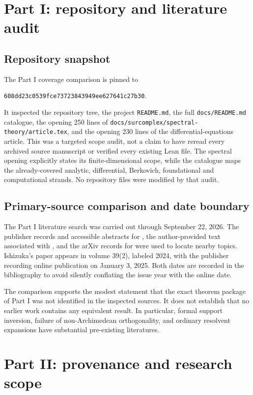 \documentclass[11pt,a4paper]{article}
\numberwithin{equation}{section}
\theoremstyle{definition}
\theoremstyle{remark}
\newcommand{\commitA}{608dd23c0539fce73723843949ee627641c27b30}
\begin{document}
\appendix
\section{Part I: repository and literature audit}\label{ihs:app:auditA}

\subsection{Repository snapshot}\label{ihs:app:snapshotA}
The Part I coverage comparison is pinned to
\begin{center}\small\texttt{\commitA}.\end{center}
It inspected the repository tree, the project \texttt{README.md}, the full
\texttt{docs/README.md} catalogue, the opening 250 lines of
\texttt{docs/surcomplex/spectral-theory/article.tex}, and the opening 230
lines of the differential-equations article. This was a targeted scope
audit, not a claim to have reread every archived source manuscript or
verified every existing Lean file. The spectral opening explicitly states
its finite-dimensional scope, while the catalogue maps the already-covered
analytic, differential, Berkovich, foundational and computational strands.
No repository files were modified by that audit.

\subsection{Primary-source comparison and date boundary}\label{ihs:app:datesA}
The Part I literature search was carried out through September 22, 2026. The
publisher records and accessible abstracts for \cite{ANS,Ishizuka}, the
author-provided text associated with \cite{AN}, and the arXiv records for
\cite{Boasso,Miabey} were used to locate nearby topics. Ishizuka's paper
appears in volume 39(2), labeled 2024, with the publisher recording online
publication on January 3, 2025. Both dates are recorded in the bibliography
to avoid silently conflating the issue year with the online date.

The comparison supports the modest statement that the exact theorem package
of Part I was not identified in the inspected sources. It does not establish
that no earlier work contains any equivalent result. In particular, formal
support inversion, failure of non-Archimedean orthogonality, and ordinary
resolvent expansions have substantial pre-existing literatures.

\section{Part II: provenance and research scope}\label{ihs:app:auditB}
\end{document}
